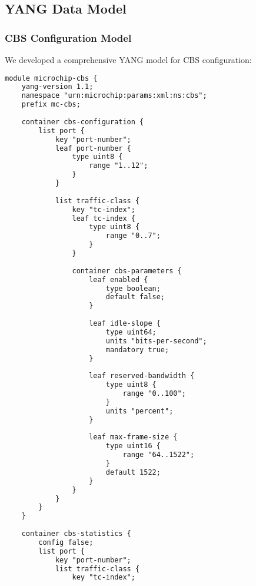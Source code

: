 \documentclass[10pt, journal, compsoc]{IEEEtran}
\begin{document}
\subsection{YANG Data Model}

\subsubsection{CBS Configuration Model}

We developed a comprehensive YANG model for CBS configuration:

\begin{lstlisting}[language=XML, caption=CBS YANG Model Extract]
module microchip-cbs {
    yang-version 1.1;
    namespace "urn:microchip:params:xml:ns:cbs";
    prefix mc-cbs;
    
    container cbs-configuration {
        list port {
            key "port-number";
            leaf port-number {
                type uint8 {
                    range "1..12";
                }
            }
            
            list traffic-class {
                key "tc-index";
                leaf tc-index {
                    type uint8 {
                        range "0..7";
                    }
                }
                
                container cbs-parameters {
                    leaf enabled {
                        type boolean;
                        default false;
                    }
                    
                    leaf idle-slope {
                        type uint64;
                        units "bits-per-second";
                        mandatory true;
                    }
                    
                    leaf reserved-bandwidth {
                        type uint8 {
                            range "0..100";
                        }
                        units "percent";
                    }
                    
                    leaf max-frame-size {
                        type uint16 {
                            range "64..1522";
                        }
                        default 1522;
                    }
                }
            }
        }
    }
    
    container cbs-statistics {
        config false;
        list port {
            key "port-number";
            list traffic-class {
                key "tc-index";
                

\end{lstlisting}
\end{document}
